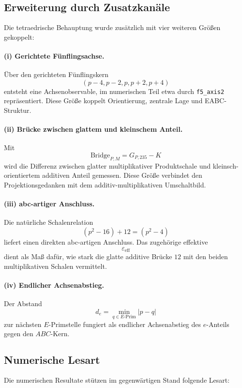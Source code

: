 \documentclass[11pt,a4paper]{article}
\theoremstyle{definition}
\begin{document}
\subsection{Erweiterung durch Zusatzkanäle}

Die tetraedrische Behauptung wurde zusätzlich mit vier weiteren Größen gekoppelt:

\paragraph{(i) Gerichtete Fünflingsachse.}
Über den gerichteten Fünflingskern
\[
(p-4,p-2,p,p+2,p+4)
\]
entsteht eine Achsenobservable, im numerischen Teil etwa durch \texttt{f5\_axis2} repräsentiert. Diese Größe koppelt Orientierung, zentrale Lage und EABC-Struktur.

\paragraph{(ii) Brücke zwischen glattem und kleinschem Anteil.}
Mit
\[
\mathrm{Bridge}_{P,M}=G_{P,235}-K
\]
wird die Differenz zwischen glatter multiplikativer Produktschale und kleinsch-orientiertem additiven Anteil gemessen. Diese Größe verbindet den Projektionsgedanken mit dem additiv-multiplikativen Umschaltbild.

\paragraph{(iii) abc-artiger Anschluss.}
Die natürliche Schalenrelation
\[
(p^2-16)+12=(p^2-4)
\]
liefert einen direkten abc-artigen Anschluss. Das zugehörige effektive
\[
\varepsilon_{\mathrm{eff}}
\]
dient als Maß dafür, wie stark die glatte additive Brücke \(12\) mit den beiden multiplikativen Schalen vermittelt.

\paragraph{(iv) Endlicher Achsenabstieg.}
Der Abstand
\[
d_e=\min_{q\in E\text{-Prim}} |p-q|
\]
zur nächsten \(E\)-Primstelle fungiert als endlicher Achsenabstieg des \(e\)-Anteils gegen den \(ABC\)-Kern.

\subsection{Numerische Lesart}

Die numerischen Resultate stützen im gegenwärtigen Stand folgende Lesart:
\end{document}
